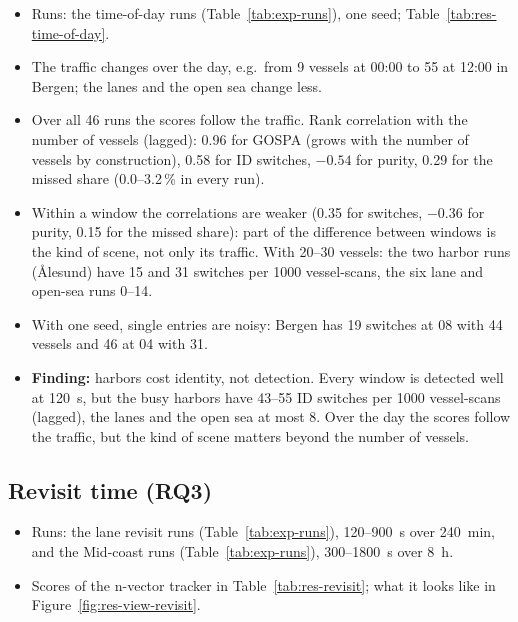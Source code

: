 \begin{itemize}
    \item Runs: the time-of-day runs (Table~\ref{tab:exp-runs}), one seed; Table~\ref{tab:res-time-of-day}.
    \item The traffic changes over the day, e.g.\ from 9 vessels at 00:00 to 55 at 12:00 in Bergen; the lanes and the open sea change less.
    \item Over all 46 runs the scores follow the traffic. Rank correlation with the number of vessels (lagged): 0.96 for GOSPA (grows with the number of vessels by construction), 0.58 for ID switches, $-0.54$ for purity, 0.29 for the missed share (0.0--3.2\,\% in every run).
    \item Within a window the correlations are weaker (0.35 for switches, $-0.36$ for purity, 0.15 for the missed share): part of the difference between windows is the kind of scene, not only its traffic. With 20--30 vessels: the two harbor runs (Ålesund) have 15 and 31 switches per 1000 vessel-scans, the six lane and open-sea runs 0--14.
    \item With one seed, single entries are noisy: Bergen has 19 switches at 08 with 44 vessels and 46 at 04 with 31.
    \item \textbf{Finding:} harbors cost identity, not detection. Every window is detected well at 120~s, but the busy harbors have 43--55 ID switches per 1000 vessel-scans (lagged), the lanes and the open sea at most 8. Over the day the scores follow the traffic, but the kind of scene matters beyond the number of vessels.
\end{itemize}

\subsection{Revisit time (RQ3)}
\label{sec:res-revisit}

\begin{itemize}
    \item Runs: the lane revisit runs (Table~\ref{tab:exp-runs}), 120--900~s over 240~min, and the Mid-coast runs (Table~\ref{tab:exp-runs}), 300--1800~s over 8~h.
    \item Scores of the n-vector tracker in Table~\ref{tab:res-revisit}; what it looks like in Figure~\ref{fig:res-view-revisit}.
\end{itemize}

